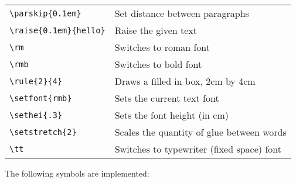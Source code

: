 \begin{tabular}{ll}
\verb+\parskip{0.1em}+      & Set distance between paragraphs \\
\verb+\raise{0.1em}{hello}+ & Raise the given text \\
\verb+\rm+                  & Switches to roman font \\
\verb+\rmb+                 & Switches to bold font \\
\verb+\rule{2}{4}+          & Draws a filled in box, 2cm by 4cm \\
\verb+\setfont{rmb}+        & Sets the current text font \\
\verb+\sethei{.3}+          & Sets the font height (in cm) \\
\verb+\setstretch{2}+       & Scales the quantity of glue between words \\
\verb+\tt+                  & Switches to typewriter (fixed space) font \\
\end{tabular}

\vspace{0.5cm}
The following symbols are implemented:
\vspace{0.5cm}

\def\bb{\hfill$\backslash$}

